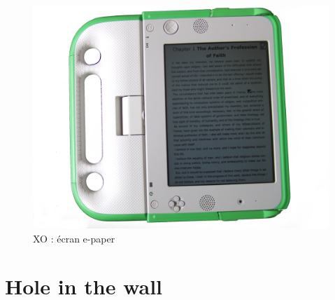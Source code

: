\begin{minipage}{.5\linewidth}
  \begin{figure}[H]
    \includegraphics[width=\linewidth]{../resources/illustrations/olpc_display}
    \caption{XO : écran e-paper}
  \end{figure}
\end{minipage}




\section{Hole in the wall}

